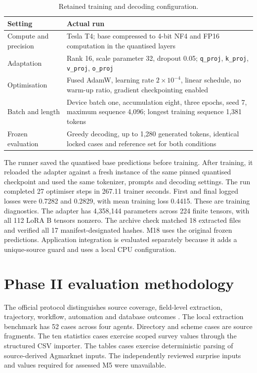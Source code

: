 \documentclass[11pt,a4paper]{article}
\newcommand{\code}[1]{\texttt{#1}}
\begin{document}
\begin{table}[!ht]
\small
\caption{Retained training and decoding configuration.}
\begin{tabularx}{\linewidth}{@{}P{.32\linewidth}Y@{}}
\toprule
Setting & Actual run\\ \midrule
Compute and precision & Tesla T4; base compressed to 4-bit NF4 and FP16 computation in the quantised layers\\
Adaptation & Rank 16, scale parameter 32, dropout 0.05; \code{q\_proj}, \code{k\_proj}, \code{v\_proj}, \code{o\_proj}\\
Optimisation & Fused AdamW, learning rate \(2\times10^{-4}\), linear schedule, no warm-up ratio, gradient checkpointing enabled\\
Batch and length & Device batch one, accumulation eight, three epochs, seed 7, maximum sequence 4,096; longest training sequence 1,381 tokens\\
Frozen evaluation & Greedy decoding, up to 1,280 generated tokens, identical locked cases and reference set for both conditions\\
\bottomrule
\end{tabularx}
\end{table}

The runner saved the quantised base predictions before training. After training, it reloaded the adapter against a fresh instance of the same pinned quantised checkpoint and used the same tokenizer, prompts and decoding settings. The run completed 27 optimiser steps in 267.11 trainer seconds. First and final logged losses were 0.7282 and 0.2829, with mean training loss 0.4415. These are training diagnostics. The adapter has 4,358,144 parameters across 224 finite tensors, with all 112 LoRA B tensors nonzero. The archive check matched 18 extracted files and verified all 17 manifest-designated hashes. M18 uses the original frozen predictions. Application integration is evaluated separately because it adds a unique-source guard and uses a local CPU configuration.

\clearpage
\section{Phase II evaluation methodology}
The official protocol distinguishes source coverage, field-level extraction, trajectory, workflow, automation and database outcomes \cite{phase2}. The local extraction benchmark has 52 cases across four agents. Directory and scheme cases are source fragments. The ten statistics cases exercise scoped survey values through the structured CSV importer. The tables cases exercise deterministic parsing of source-derived Agmarknet inputs. The independently reviewed surprise inputs and values required for assessed M5 were unavailable.
\end{document}
